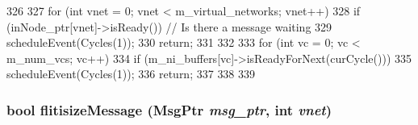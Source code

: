 \begin{DoxyCode}
326 {
327     for (int vnet = 0; vnet < m_virtual_networks; vnet++) {
328         if (inNode_ptr[vnet]->isReady()) { // Is there a message waiting
329             scheduleEvent(Cycles(1));
330             return;
331         }
332     }
333     for (int vc = 0; vc < m_num_vcs; vc++) {
334         if (m_ni_buffers[vc]->isReadyForNext(curCycle())) {
335             scheduleEvent(Cycles(1));
336             return;
337         }
338     }
339 }
\end{DoxyCode}
\hypertarget{classNetworkInterface_a12a9945591ab6cd27b4cf0df84786cf8}{
\subsubsection[{flitisizeMessage}]{\setlength{\rightskip}{0pt plus 5cm}bool flitisizeMessage ({\bf MsgPtr} {\em msg\_\-ptr}, \/  int {\em vnet})}}
\label{classNetworkInterface_a12a9945591ab6cd27b4cf0df84786cf8}



